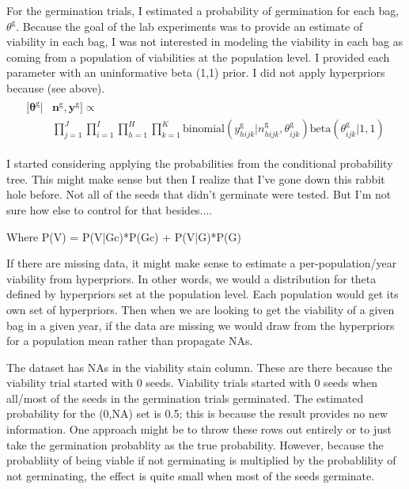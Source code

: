 \documentclass[12pt, oneside, titlepage]{article}   	%
\begin{document}
For the germination trials, I estimated a probability of germination for each bag, $\theta^\mathrm{g}$. Because the goal of the lab experiments was to provide an estimate of viability in each bag, I was not interested in modeling the viability in each bag as coming from a population of viabilities at the population level. I provided each parameter with an uninformative beta (1,1) prior. I did not apply hyperpriors because (see above).
%
\begin{align}
  \begin{split}
 [\bm{\theta^{\mathrm{g}}} | & \bm{n^{\mathrm{g}}}, \bm{y^{\mathrm{g}}} ] \propto
 \\  & \prod_{j=1}^{J} \prod_{i=1}^{I}  \prod_{h=1}^{H} \prod_{k=1}^{K}  \mathrm{binomial} ( y^{\mathrm{g}}_{hijk} | n^{\mathrm{g}}_{hijk}, \theta^{\mathrm{g}}_{ijk} )
\mathrm{beta} (  \theta^{\mathrm{g}}_{ijk} | 1 , 1 )
  \end{split}
\end{align}

I started considering applying the probabilities from the conditional probability tree. This might make sense but then I realize that I've gone down this rabbit hole before. Not all of the seeds that didn't germinate were tested. But I'm not sure how else to control for that besides....

Where P(V) = P(V|Gc)*P(Gc) + P(V|G)*P(G)

If there are missing data, it might make sense to estimate a per-population/year viability from hyperpriors. In other words, we would a distribution for theta defined by hyperpriors set at the population level. Each population would get its own set of hyperpriors. Then when we are looking to get the viability of a given bag in a given year, if the data are missing we would draw from the hyperpriors for a population mean rather than propagate NAs. 

The dataset has NAs in the viability stain column. These are there because the viability trial started with 0 seeds. Viability trials started with 0 seeds when all/most of the seeds in the germination trials germinated. The estimated probability for the (0,NA) set is 0.5; this is because the result provides no new information. One approach might be to throw these rows out entirely or to just take the germination probablity as the true probability. However, because the probabliity of being viable if not germinating is multiplied by the probablility of not germinating, the effect is quite small when most of the seeds germinate. 
\end{document}
